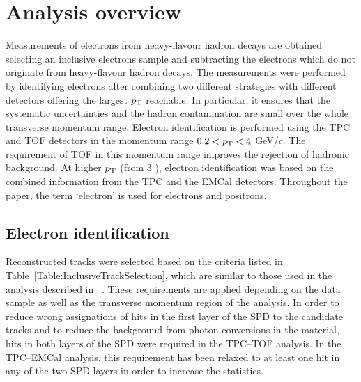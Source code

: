 \section{Analysis overview}\label{section:heavyflavour}
Measurements of electrons from heavy-flavour hadron decays are  obtained selecting an inclusive electrons sample and subtracting the electrons which do not originate from heavy-flavour hadron decays. The measurements were performed by identifying electrons after combining two different  strategies with different detectors offering the largest $p_{\rm{T}}$ reachable. In particular, it ensures that the systematic uncertainties and the hadron contamination are small over the whole transverse momentum range. Electron identification is performed using the TPC and TOF detectors in the momentum range $0.2 < p_{\rm{T}} < 4$ GeV/$c$. The requirement of TOF in this momentum range improves the rejection of hadronic background. At higher $p_{\rm{T}}$ (from 3 \GeVc), electron identification was based on the combined information from the TPC and the EMCal detectors. 
Throughout the paper, the term ‘electron’ is used for electrons and positrons. 



\subsection{Electron identification}
Reconstructed tracks were selected based on the criteria listed in Table~\ref{Table:InclusiveTrackSelection}, which are similar to those used in the analysis described in ~\cite{Acharya:2019hao, Acharya:2019mom}. These requirements are applied depending on the data sample as well as the transverse momentum region of the analysis. %
In order to reduce wrong assignations of hits in the first layer of the SPD to the candidate tracks and to reduce the background from photon conversions in the material, hits in both layers of the SPD
were required in the TPC--TOF analysis. In the TPC--EMCal analysis, this requirement has been relaxed to at least one hit in any of the two SPD layers in order to increase the statistics. 

